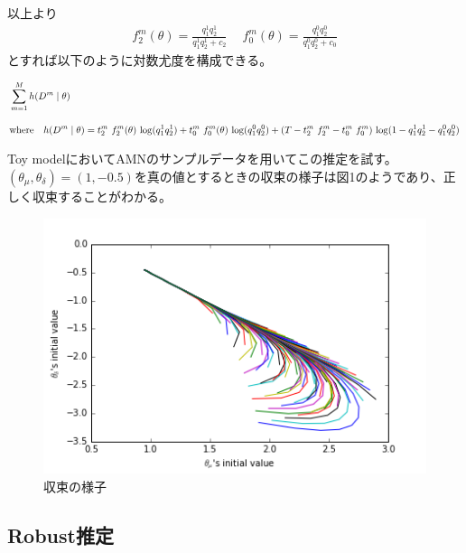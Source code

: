 \documentclass{jsarticle}
\begin{document}
以上より
\begin{align*}
	f_2^m(\theta) = \frac{q_1^1 q_2^1}{q_1^1 q_2^1+ c_2}\quad\ f_0^m(\theta) = \frac{q_1^0 q_2^0}{q_1^0 q_2^0+ c_0}
\end{align*}
とすれば以下のように対数尤度を構成できる。

\begin{align*}
	&\sum_{m = 1}^M h(D^m \mid \theta)\\[10pt]
	&\text{where}\quad h(D^m \mid \theta) = t_2^m\ f_2^m(\theta)\ {\rm log} (q_1^1 q_2^1) + t_0^m\ f_0^m(\theta)\ {\rm log} (q_1^0 q_2^0) + (T - t_2^m\ f_2^m - t_0^m\ f_0^m)\ {\rm log} (1- q_1^1 q_2^1 - q_1^0 q_2^0)
\end{align*}

Toy modelにおいてAMNのサンプルデータを用いてこの推定を試す。$(\theta_{\mu}, \theta_{\delta}) = (1, -0.5)$を真の値とするときの収束の様子は図1のようであり、正しく収束することがわかる。
\begin{figure}[h]
\centering
\includegraphics{conversion.png}
\caption{収束の様子}
\end{figure}

\subsection{Robust推定}
\end{document}
